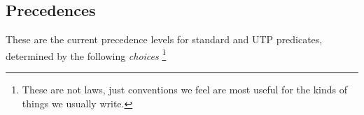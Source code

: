 \subsection{Precedences}\label{ssec:prec}


These are the current precedence levels for standard and UTP predicates,
determined by the following \emph{choices}%
\footnote{These are not laws,
just conventions we feel are most useful
for the kinds of things we usually write.}%
